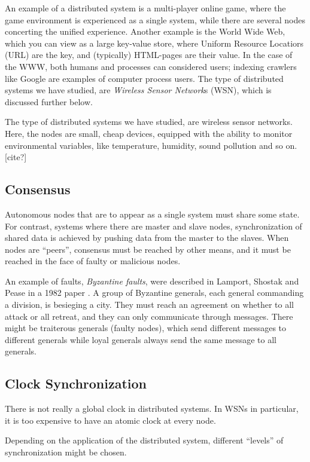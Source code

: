 \documentclass[a4paper,12pt]{article}
\begin{document}
An example of a distributed system is a multi-player online game, where
the game environment is experienced as a single system, while there
are several nodes concerting the unified experience.  Another example
is the World Wide Web, which you can view as a large key-value store,
where Uniform Resource Locatiors (URL) are the key, and (typically)
HTML-pages are their value.  In the case of the WWW, both humans and
processes can considered users; indexing crawlers like Google are
examples of computer process users.  The type of distributed systems
we have studied, are \textit{Wireless Sensor Network}s (WSN), which is
discussed further below.

The type of distributed systems we have studied, are wireless sensor
networks.  Here, the nodes are small, cheap devices, equipped with the
ability to monitor environmental variables, like temperature,
humidity, sound pollution and so on. [cite?]

\subsection{Consensus}

Autonomous nodes that are to appear as a single system must share some
state.  For contrast, systems where there are master and slave nodes,
synchronization of shared data is achieved by pushing data from the
master to the slaves.  When nodes are ``peers'', consensus must be
reached by other means, and it must be reached in the face of faulty
or malicious nodes.

An example of faults, \textit{Byzantine faults}, were described in
Lamport, Shostak and Pease in a 1982 paper \cite{Lamport82}.  A group
of Byzantine generals, each general commanding a division, is
besieging a city.  They must reach an agreement on whether to all
attack or all retreat, and they can only communicate through messages.
There might be traiterous generals (faulty nodes), which send
different messages to different generals while loyal generals always
send the same message to all generals.

\subsection{Clock Synchronization}

There is not really a global clock in distributed systems.  In WSNs in
particular, it is too expensive to have an atomic clock at every node.

Depending on the application of the distributed system, different
``levels'' of synchronization might be chosen.  
\end{document}
